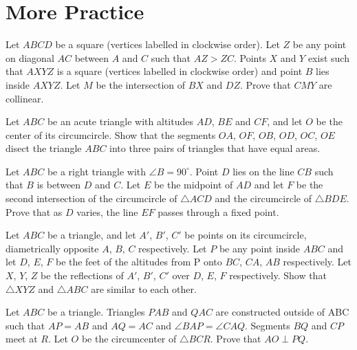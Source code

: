 \documentclass[11pt]{scrartcl}
\begin{document}
\section{More Practice}
\begin{exercise}[NZMO 2023/3]
  Let $ABCD$ be a square (vertices labelled in clockwise order). Let $Z$ be any point on diagonal $AC$ between $A$ and $C$ such that $AZ>ZC$. Points $X$ and $Y$ exist such that $AXYZ$ is a square (vertices labelled in clockwise order) and point $B$ lies inside $AXYZ$. Let $M$ be the intersection of $BX$ and $DZ$. Prove that $CMY$ are collinear.
\end{exercise} 
\begin{exercise}[APMO 2013/1]
  Let $ABC$ be an acute triangle with altitudes $AD$, $BE$ and $CF$, and let $O$ be the center of its circumcircle. Show that the segments $OA$, $OF$, $OB$, $OD$, $OC$, $OE$ disect the triangle $ABC$ into three pairs of triangles that have equal areas. 
\end{exercise}
\begin{exercise}[APMO 2022/2]
  Let $ABC$ be a right triangle with $\angle B=90^{\circ}$. Point $D$ lies on the line $CB$ such that $B$ is between $D$ and $C$. Let $E$ be the midpoint of $AD$ and let $F$ be the second intersection of the circumcircle of $\triangle ACD$ and the circumcircle of $\triangle BDE$. Prove that as $D$ varies, the line $EF$ passes through a fixed point.
\end{exercise}
\begin{exercise}
  Let $ABC$ be a triangle, and let $A'$, $B'$, $C'$ be points on its circumcircle, diametrically opposite $A$, $B$, $C$ respectively. Let $P$ be any point inside $ABC$ and let $D$, $E$, $F$ be the feet of the altitudes from P onto $BC$, $CA$, $AB$ respectively. Let $X$, $Y$, $Z$ be the reflections of $A'$, $B'$, $C'$ over $D$, $E$, $F$ respectively. Show that $\triangle XYZ$ and $\triangle ABC$ are similar to each other.
\end{exercise}
\begin{exercise}
  Let $ABC$ be a triangle. Triangles $PAB$ and $QAC$ are constructed outside of ABC such that $AP=AB$ and $AQ=AC$ and $\angle BAP = \angle CAQ$. Segments $BQ$ and $CP$ meet at $R$. Let $O$ be the circumcenter of $\triangle BCR$. Prove that $AO \perp PQ$.
\end{exercise}
\end{document}
